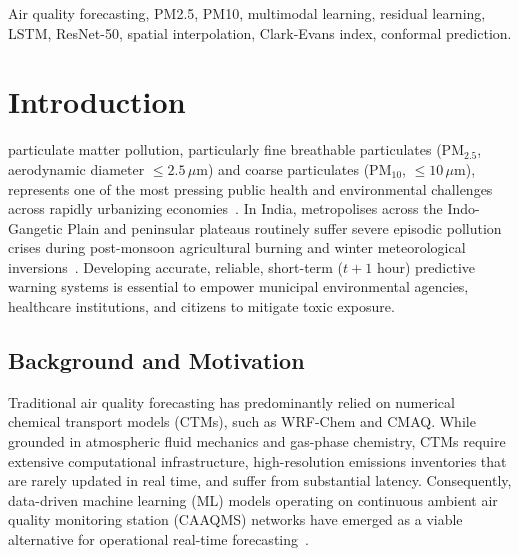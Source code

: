\documentclass[conference]{IEEEtran}
\begin{document}
\begin{IEEEkeywords}
Air quality forecasting, PM2.5, PM10, multimodal learning, residual learning, LSTM, ResNet-50, spatial interpolation, Clark-Evans index, conformal prediction.
\end{IEEEkeywords}

\section{Introduction}
 particulate matter pollution, particularly fine breathable particulates ($\text{PM}_{2.5}$, aerodynamic diameter $\le 2.5\,\mu\text{m}$) and coarse particulates ($\text{PM}_{10}$, $\le 10\,\mu\text{m}$), represents one of the most pressing public health and environmental challenges across rapidly urbanizing economies~\cite{cpcb2009naaqs, guttikunda2014nature}. In India, metropolises across the Indo-Gangetic Plain and peninsular plateaus routinely suffer severe episodic pollution crises during post-monsoon agricultural burning and winter meteorological inversions~\cite{pant2015air}. Developing accurate, reliable, short-term ($t+1$ hour) predictive warning systems is essential to empower municipal environmental agencies, healthcare institutions, and citizens to mitigate toxic exposure.

\subsection{Background and Motivation}
Traditional air quality forecasting has predominantly relied on numerical chemical transport models (CTMs), such as WRF-Chem and CMAQ. While grounded in atmospheric fluid mechanics and gas-phase chemistry, CTMs require extensive computational infrastructure, high-resolution emissions inventories that are rarely updated in real time, and suffer from substantial latency. Consequently, data-driven machine learning (ML) models operating on continuous ambient air quality monitoring station (CAAQMS) networks have emerged as a viable alternative for operational real-time forecasting~\cite{zheng2015forecasting, wang2020spatial}.
\end{document}

